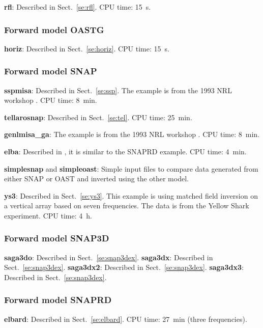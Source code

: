 \documentclass{saclantc}
\begin{document}
\vspace*{-1.0mm}\noindent
{\bf rfl}: Described in Sect.~\ref{se:rfl}. CPU time: 15~s.

\subsubsection{Forward model OASTG}

\vspace*{-1.0mm}\noindent
{\bf horiz}: Described in Sect.~\ref{se:horiz}. CPU time: 15~s.

\subsubsection{Forward model SNAP}

\vspace*{-1.0mm}\noindent
{\bf sspmisa}: Described in Sect.~\ref{se:ssp}. 
The example is from the 1993 NRL
workshop \cite{porter:jca94}. CPU time: 8~min.

\noindent
{\bf tellarosnap}: Described in Sect.~\ref{se:tel}. CPU time: 25~min.
\noindent

{\bf genlmisa\_ga}:  The example is from the 1993 NRL
workshop \cite{porter:jca94}. 
CPU time: 8~min.

\noindent
{\bf elba}: Described in \cite{gingras:asa95}, 
it is similar to the {\sf SNAPRD}
example. CPU time: 4~min.

\noindent
{\bf simplesnap} and {\bf simpleoast}: Simple input files to compare
data generated from either {\sf SNAP} or {\sf OAST} and inverted using the 
other model. 

{\bf ys3}: Described in Sect.\ \ref{se:ys3}.
This example is using matched field inversion on
a vertical array based on seven frequencies. The data is from the Yellow
Shark experiment. CPU time: 4~h.

\subsubsection{Forward model SNAP3D}

\vspace*{-1.0mm}\noindent
{\bf saga3do}: Described in Sect.~\ref{se:snap3dex}. 
{\bf saga3dx}: Described in Sect.~\ref{se:snap3dex}. 
{\bf saga3dx2}: Described in Sect.~\ref{se:snap3dex}. 
{\bf saga3dx3}: Described in Sect.~\ref{se:snap3dex}. 

\subsubsection{Forward model SNAPRD}
\noindent
{\bf elbard}: Described in Sect.~\ref{se:elbard}. 
 CPU time: 27~min (three frequencies).
\end{document}
